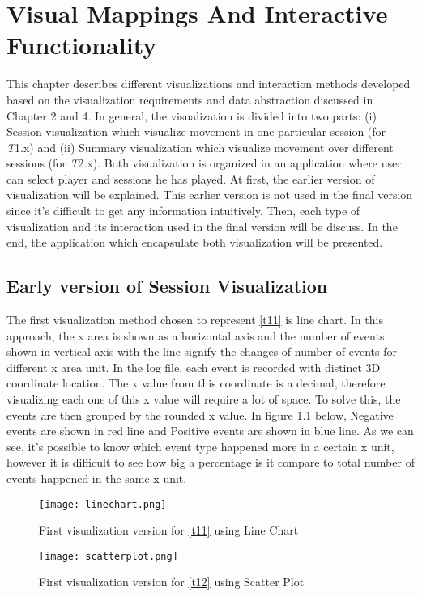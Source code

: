 \chapter{Visual Mappings And Interactive Functionality}
This chapter describes different visualizations and interaction methods developed based on the visualization requirements and data abstraction discussed in Chapter 2 and 4. In general, the visualization is divided into two parts: (i) Session visualization which visualize movement in one particular session (for \textit{T}1.x) and (ii) Summary visualization which visualize movement over different sessions (for \textit{T}2.x). Both visualization is organized in an application where user can select player and sessions he has played. At first, the earlier version of visualization will be explained. This earlier version is not used in the final version since it's difficult to get any information intuitively. Then, each type of visualization and its interaction used in the final version will be discuss. In the end, the application which encapsulate both visualization will be presented.

\section{Early version of Session Visualization}
The first visualization method chosen to represent \ref{t11} is line chart. In this approach, the x area is shown as a horizontal axis and the number of events shown in vertical axis with the line signify the changes of number of events for different x area unit. In the log file, each event is recorded with distinct 3D coordinate location. The x value from this coordinate is a decimal, therefore visualizing each one of this x value will require a lot of space. To solve this, the events are then grouped by the rounded x value. In figure \ref{first_linechart} below, Negative events are shown in red line and Positive events are shown in blue line. As we can see, it's possible to know which event type happened more in a certain x unit, however it is difficult to see how big a percentage is it compare to total number of events happened in the same x unit.

\begin{figure}
\centering
\texttt{[image: linechart.png]}
\caption{First visualization version for \ref{t11} using Line Chart}
\label{first_linechart}
\end{figure}

\begin{figure}
\centering
\texttt{[image: scatterplot.png]}
\caption{First visualization version for \ref{t12} using Scatter Plot}
\label{first_scatterplot}
\end{figure}

